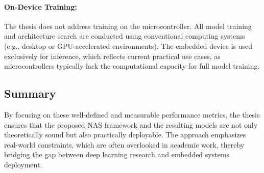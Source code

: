 \paragraph{\textbf{On-Device Training}:}
The thesis does not address training on the microcontroller. All model training and architecture search are conducted using conventional computing systems (e.g., desktop or GPU-accelerated environments). The embedded device is used exclusively for inference, which reflects current practical use cases, as microcontrollers typically lack the computational capacity for full model training.

\subsection{\textbf{Summary}}

By focusing on these well-defined and measurable performance metrics, the thesis ensures that the proposed NAS framework and the resulting models are not only theoretically sound but also practically deployable. The approach emphasizes real-world constraints, which are often overlooked in academic work, thereby bridging the gap between deep learning research and embedded systems deployment.



